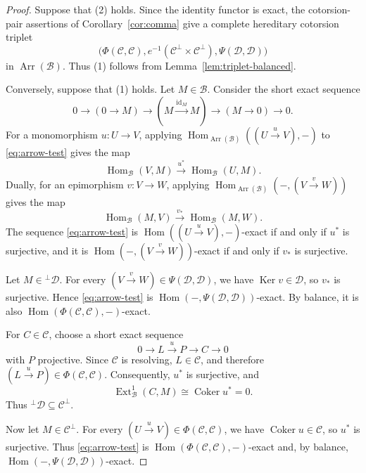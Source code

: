 \documentclass[11pt]{amsart}
\theoremstyle{definition}
\theoremstyle{remark}
\theoremstyle{plain}
\numberwithin{equation}{section}
\begin{document}
\begin{proof}
	Suppose that \textup{(2)} holds. Since the identity functor is
	exact, the cotorsion-pair assertions of
	Corollary~\ref{cor:comma} give a complete hereditary cotorsion triplet
	\[
	\bigl(
	\Phi(\mathcal{C},\mathcal{C}),
	e^{-1}(\mathcal{C}^{\perp}\times\mathcal{C}^{\perp}),
	\Psi(\mathcal{D},\mathcal{D})
	\bigr)
	\]
	in $\operatorname{Arr}(\mathcal{B})$.
	Thus \textup{(1)} follows from
	Lemma~\ref{lem:triplet-balanced}.
	
	Conversely, suppose that \textup{(1)} holds.
	Let  $M\in\mathcal{B}$. Consider the short exact sequence
	\begin{equation}\label{eq:arrow-test}
		0\longrightarrow (0\to M)
		\longrightarrow (M\xrightarrow{\mathrm{id}_M}M)
		\longrightarrow (M\to0)
		\longrightarrow0.
	\end{equation}
	For a monomorphism $u:U\to V$, applying
	$\operatorname{Hom}_{\operatorname{Arr}(\mathcal{B})}
	((U\xrightarrow{u}V),-)$ to \eqref{eq:arrow-test} gives the map
	\[
	\operatorname{Hom}_{\mathcal{B}}(V,M)
	\xrightarrow{u^*}
	\operatorname{Hom}_{\mathcal{B}}(U,M).
	\]
	Dually, for an epimorphism $v:V\to W$, applying
	$\operatorname{Hom}_{\operatorname{Arr}(\mathcal{B})}
	(-,(V\xrightarrow{v}W))$ gives the map
	\[
	\operatorname{Hom}_{\mathcal{B}}(M,V)
	\xrightarrow{v_*}
	\operatorname{Hom}_{\mathcal{B}}(M,W).
	\]
	The sequence \eqref{eq:arrow-test} is
	$\operatorname{Hom}((U\xrightarrow{u}V),-)$-exact if and only if $u^*$ is surjective, and it is
	$\operatorname{Hom}(-,(V\xrightarrow{v}W))$-exact if and only if $v_*$ is surjective.
	
	Let $M\in{}^\perp\mathcal{D}$. For every $(V\xrightarrow{v}W)\in \Psi(\mathcal{D},\mathcal{D})$, we have
	$\operatorname{Ker}v\in\mathcal{D}$, so $v_*$ is surjective. Hence \eqref{eq:arrow-test} is
	$\operatorname{Hom}(-,\Psi(\mathcal{D},\mathcal{D}))$-exact. By balance, it is also
	$\operatorname{Hom}(\Phi(\mathcal{C},\mathcal{C}),-)$-exact.
	
	For $C\in\mathcal{C}$, choose a short exact sequence
	\[
	0\longrightarrow L\xrightarrow{u}P
	\longrightarrow C\longrightarrow0
	\]
	with $P$ projective.
	Since $\mathcal{C}$ is resolving, $L\in\mathcal{C}$, and
	therefore $(L\xrightarrow{u}P)\in
	\Phi(\mathcal{C},\mathcal{C})$.
	Consequently, $u^*$ is surjective, and
	\[
	\operatorname{Ext}^1_{\mathcal{B}}(C,M)
	\cong\operatorname{Coker}u^*=0.
	\]
	Thus ${}^\perp\mathcal{D}\subseteq\mathcal{C}^\perp$.
	
	Now let $M\in\mathcal{C}^\perp$. For every $(U\xrightarrow{u}V)\in \Phi(\mathcal{C},\mathcal{C})$, we have
	$\operatorname{Coker}u\in\mathcal{C}$, so $u^*$ is surjective. Thus \eqref{eq:arrow-test} is
	$\operatorname{Hom}(\Phi(\mathcal{C},\mathcal{C}),-)$-exact and, by balance,
	$\operatorname{Hom}(-,\Psi(\mathcal{D},\mathcal{D}))$-exact.
	

\end{proof}
\end{document}

